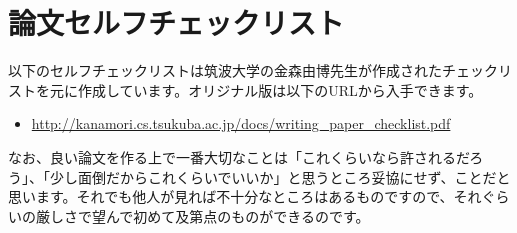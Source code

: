 \chapter{論文セルフチェックリスト}
\label{chap:self-check}

以下のセルフチェックリストは筑波大学の金森由博先生が作成されたチェックリストを元に作成しています。オリジナル版は以下のURLから入手できます。
\begin{itemize}
  \item \url{http://kanamori.cs.tsukuba.ac.jp/docs/writing_paper_checklist.pdf}
\end{itemize}

なお、良い論文を作る上で一番大切なことは「これくらいなら許されるだろう」、「少し面倒だからこれくらいでいいか」と思うところ妥協にせず、ことだと思います。それでも他人が見れば不十分なところはあるものですので、それぐらいの厳しさで望んで初めて及第点のものができるのです。

